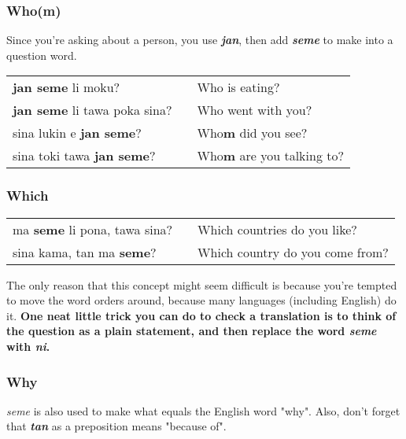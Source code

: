 \subsubsection*{Who(m)}
%
Since you're asking about a person, you use \textbf{\textit{jan}}, then add \textbf{\textit{seme}} to make into a question word. 

\begin{supertabular}{p{5,5cm}|ll}
\textbf{jan seme} li moku? && Who is eating? \\
\textbf{jan seme} li tawa poka sina? && Who went with you? \\
sina lukin e \textbf{jan seme}? && Who\textbf{m} did you see? \\
sina toki tawa \textbf{jan seme}? && Who\textbf{m} are you talking to? \\
\end{supertabular} 
%
\subsubsection*{Which}
%
\begin{supertabular}{p{5,5cm}|ll}
ma \textbf{seme} li pona, tawa sina? && Which countries do you like? \\
sina kama, tan ma \textbf{seme}? && Which country do you come from? \\ 
\end{supertabular} 

The only reason that this concept might seem difficult is because you're tempted to move the word orders around, because many languages (including English) do it. 
\textbf{One neat little trick you can do to check a translation is to think of the question as a plain statement, and then replace the word \textit{seme} with \textit{ni}.} 
%
{}
\subsubsection*{Why}
%
\textit{seme} is also used to make what equals the English word "why". 
Also, don't forget that \textbf{\textit{tan}} as a preposition means "because of".


